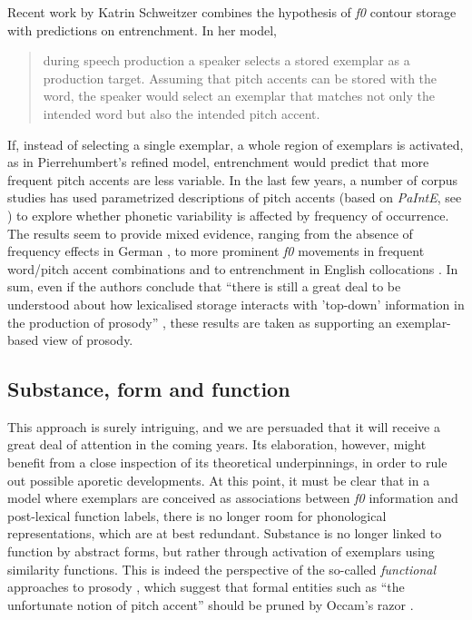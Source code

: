 Recent work by Katrin Schweitzer combines the hypothesis of \textit{f0} contour storage with predictions on entrenchment. In her model, \begin{quote}during speech production a speaker selects a stored exemplar as a production target. Assuming that pitch accents can be stored with the word, the speaker would select an exemplar that matches not only the intended word but also the intended pitch accent. \cite[138]{schweitzer2010frequency}\end{quote}
If, instead of selecting a single exemplar, a whole region of exemplars is activated, as in Pierrehumbert's refined model, entrenchment would predict that more frequent pitch accents are less variable. In the last few years, a number of corpus studies has used parametrized descriptions of pitch accents (based on \textit{PaIntE}, see \citealt{mohler1998parametric,mohler2001improvements}) to explore whether phonetic variability is affected by frequency of occurrence. The results seem to provide mixed evidence, ranging from the absence of frequency effects in German \citep{walsh2008examining}, to more prominent \textit{f0} movements in frequent word/pitch accent combinations \citep{schweitzer2010frequency} and to entrenchment in English collocations \citep{schweitzer2011prosodic}. In sum, even if the authors conclude that ``there is still a great deal to be understood about how lexicalised storage interacts with 'top-down' information in the production of prosody'' \cite[4]{schweitzer2011prosodic}, these results are taken as supporting an exemplar-based view of prosody.

\subsection{Substance, form and function}\label{sec632}
This approach is surely intriguing, and we are persuaded that it will receive a great deal of attention in the coming years. Its elaboration, however, might benefit from a close inspection of its theoretical underpinnings, in order to rule out possible aporetic developments. At this point, it must be clear that in a model where exemplars are conceived as associations between \textit{f0} information and post-lexical function labels, there is no longer room for phonological representations, which are at best redundant. Substance is no longer linked to function by abstract forms, but rather through activation of exemplars using similarity functions. This is indeed the perspective of the so-called \textit{functional} approaches to prosody \citep{shriberg1998can,noth2000verbmobil,batliner2001prosodic}, which suggest that formal entities such as ``the unfortunate notion of pitch accent'' should be pruned by Occam's razor \citep[25]{batliner2005prosodic}. 

